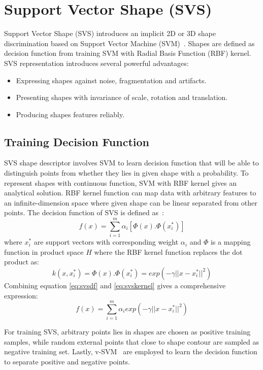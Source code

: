\section{Support Vector Shape (SVS)}
\label{sec:bg_svs}
Support Vector Shape (SVS) introduces an implicit 2D or 3D shape discrimination based on Support Vector Machine (SVM)~\cite{Nguyen2013}. Shapes are defined as decision function from training SVM with Radial Basis Function (RBF) kernel. SVS representation introduces several powerful advantages:
\begin{itemize}
  \item Expressing shapes against noise, fragmentation and artifacts.
  \item Presenting shapes with invariance of scale, rotation and translation.
  \item Producing shapes features reliably.
\end{itemize}

\subsection{Training Decision Function}
SVS shape descriptor involves SVM to learn decision function that will be able to distinguish points from whether they lies in given shape with a probability. To represent shapes with continuous function, SVM with RBF kernel gives an analytical solution. RBF kernel function can map data with arbitrary features to an infinite-dimension space where given shape can be linear separated from other points. The decision function of SVS is defined as~\cite{Nguyen2013}:
\begin{equation}
\label{eq:svsdf}
f(x)=\sum^m_{i=1}\alpha_i[\Phi(x).\Phi(x^*_i)]
\end{equation}
where $x^*_i$ are support vectors with corresponding weight $\alpha_i$ and $\Phi$ is a mapping function in product space $H$ where the RBF kernel function replaces the dot product as:
\begin{equation}
\label{eq:svskernel}
k(x,x^*_i)=\Phi(x).\Phi(x^*_i)=exp(-\gamma||x-x^*_i||^2)
\end{equation}
Combining equation \ref{eq:svsdf} and \ref{eq:svskernel} gives a comprehensive expression:
\begin{equation}
\label{eq:svs}
f(x)=\sum^m_{i=1}\alpha_iexp(-\gamma||x-x^*_i||^2)
\end{equation}

For training SVS, arbitrary points lies in shapes are chosen as positive training samples, while random external points that close to shape contour are sampled as negative training set. Lastly, v-SVM~\cite{scholkopf2001estimating} are employed to learn the decision function to separate positive and negative points.

